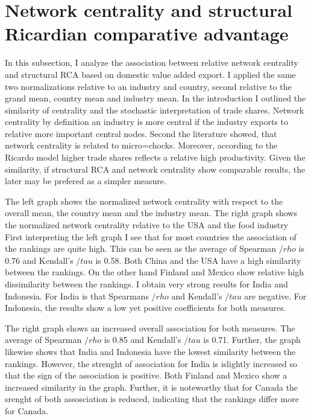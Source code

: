 \section{Network centrality and structural Ricardian comparative advantage}
In this subsection, I analyze the association between relative network centrality and  structural RCA based on domestic value added export.
I applied the same two normalizations relative to an industry and country, second relative to the grand mean, country mean and industry mean.
In the introduction I  outlined the similarity of centrality and the stochastic  interpretation of trade shares.
 Network centrality by definition an industry is more central if the industry exports to relative more important central nodes.
 Second the literature showed, that network centrality is related to micro=chocks.
Moreover, according to the Ricardo model higher trade shares reflects a relative high productivity.
Given the similarity, if structural RCA and network centrality show comparable results, the later may be prefered as a simpler measure.    \par
The left graph shows the normalized network centrality with respect to the overall mean, the country mean and the industry mean.
The right graph shows the normalized network centrality relative to the USA and the food industry
First interpreting the left graph I see that for most countries the association of the rankings are quite high.
This can be seen as the average of Spearman $/rho$ is  0.76 and Kendall's  $/tau$ is 0.58.
Both China and the USA have a high similarity between the rankings.
On the other hand Finland and Mexico show relative high dissimilarity between the rankings.
I obtain very strong results for India and Indonesia.
For India is that Spearmans $/rho$ and  Kendall's  $/tau$ are negative.
For Indonesia, the results show a low yet positive coefficients for both measures.
\par
The right graph shows an increased overall association for both measures.
The average of Spearman $/rho$ is  0.85 and Kendall's  $/tau$ is 0.71.
Further, the graph likewise shows that India and Indonesia have the lowest similarity between the rankings.
However, the strenght of association for India is islightly increased so that the sign of the association is positive.
Both Finland and Mexico show a increased similarity in the graph.
Further, it is noteworthy that for Canada the srenght of both assosciation is reduced, indicating that the
rankings differ more for Canada.

